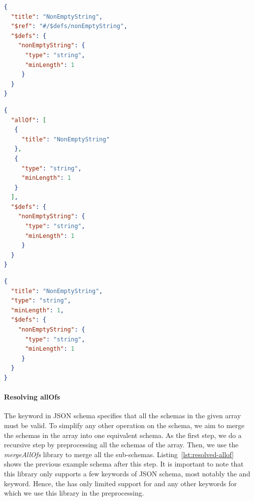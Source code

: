 \begin{lstlisting}[language=json,firstnumber=1,caption=
    {Simple JSON schema before reference resolving},captionpos=b,label={lst:preprocessing-example}]
{
  "title": "NonEmptyString",
  "$ref": "#/$defs/nonEmptyString",
  "$defs": {
    "nonEmptyString": {
      "type": "string",
      "minLength": 1
     }
  }
}
\end{lstlisting}

\begin{lstlisting}[language=json,firstnumber=1,caption=
    {Simple JSON schema after reference resolving},captionpos=b,label={lst:reference-resolving}]
{
  "allOf": [
   {
     "title": "NonEmptyString"
   },
   {
     "type": "string",
     "minLength": 1
   }
  ],
  "$defs": {
    "nonEmptyString": {
      "type": "string",
      "minLength": 1
     }
  }
}
\end{lstlisting}

\begin{lstlisting}[language=json, firstnumber=1, caption=
    {Simple JSON schema after allOf resolving}, captionpos=b,label={lst:resolved-allof}]
{
  "title": "NonEmptyString",
  "type": "string",
  "minLength": 1,
  "$defs": {
    "nonEmptyString": {
      "type": "string",
      "minLength": 1
     }
  }
}
\end{lstlisting}

\paragraph{Resolving allOfs}

The  keyword in JSON schema specifies that all the schemas in the given array must be valid.
To simplify any other operation on the schema, we aim to merge the schemas in the  array into one equivalent schema.
As the first step, we do a recursive step by preprocessing all the schemas of the  array.
Then, we use the \textit{mergeAllOfs}\cite{githubGitHubMokkabonnajsonschemamergeallof} library to merge all the sub-schemas.
Listing~\ref{lst:resolved-allof} shows the previous example schema after this step.
It is important to note that this library only supports a few keywords of JSON schema, most notably the
 and  keyword.
Hence, the \toolname{} has only limited support for  and any other keywords for which we use this library in the preprocessing.

